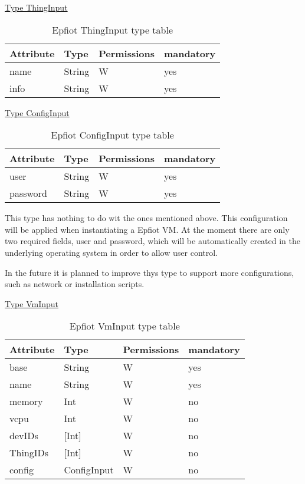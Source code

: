 \underline{Type ThingInput}
\begin{table}[H]
\begin{center}
\begin{tabular}[b]{|l|l|l|l|}
    \hline
    Attribute & Type & Permissions & mandatory \\
    \hline
    name & String & W & yes\\
    \hline
    info & String & W & yes\\
    \hline
\end{tabular}
\caption{Epfiot ThingInput type table}
\label{table1}
\end{center}
\end{table}

\underline{Type ConfigInput}
\begin{table}[H]
\begin{center}
\begin{tabular}[b]{|l|l|l|l|}
    \hline
    Attribute & Type & Permissions & mandatory \\
    \hline
    user & String & W & yes\\
    \hline
    password & String & W & yes\\
    \hline
\end{tabular}
\caption{Epfiot ConfigInput type table}
\label{table1}
\end{center}
\end{table}

This type has nothing to do wit the ones mentioned above.
This configuration will be applied when instantiating a Epfiot VM. At the moment there are only two required fields, user and password, which will be automatically created in the underlying operating system in order to allow user control.

In the future it is planned to improve thys type to support more configurations, such as network or installation scripts.
\newpage

\underline{Type VmInput}
\begin{table}[H]
\begin{center}
\begin{tabular}[b]{|l|l|l|l|}
    \hline
    Attribute & Type & Permissions & mandatory \\
    \hline
    base & String & W & yes\\
    \hline
    name & String & W & yes\\
    \hline
    memory & Int & W & no\\
    \hline
    vcpu & Int & W & no\\
    \hline
    devIDs & [Int] & W & no\\
    \hline
    ThingIDs & [Int] & W & no\\
    \hline
    config & ConfigInput & W & no\\
    \hline
\end{tabular}
\caption{Epfiot VmInput type table}
\label{table1}
\end{center}
\end{table}


